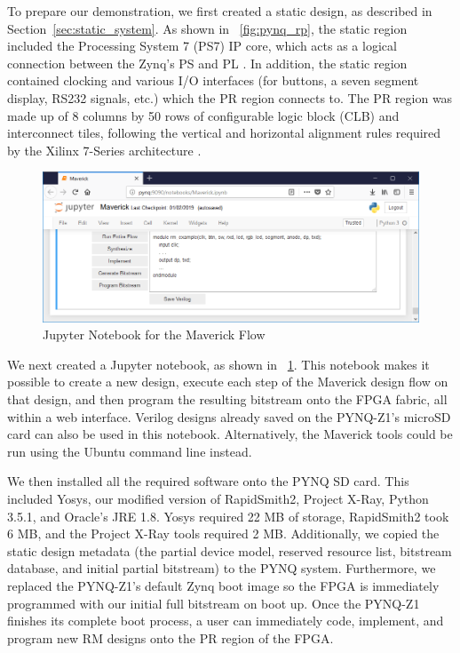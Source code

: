 To prepare our demonstration, we first created a static design, as described in Section~\ref{sec:static_system}. 
As shown in \figurename~\ref{fig:pynq_rp}, the static region included the Processing System 7 (PS7) IP core, which acts as a logical connection between the Zynq's PS and PL \cite{Xilinx:2017}. 
In addition, the static region contained clocking and various I/O interfaces (for buttons, a seven segment display, RS232 signals, etc.) which the PR region connects to.
The PR region was made up of 8 columns by 50 rows of configurable logic block (CLB) and interconnect tiles, following the vertical and horizontal alignment rules required by the Xilinx 7-Series architecture \cite{Xilinx:2018d}. 

\begin{figure}[htb]
	\centering
	\includegraphics[width=.85\textwidth,keepaspectratio]{figures/notebook.png}
	\caption{Jupyter Notebook for the Maverick Flow}
	\label{fig:notebook}
\end{figure}

We next created a Jupyter notebook, as shown in \figurename~\ref{fig:notebook}.
This notebook makes it possible to create a new design, execute each step of the Maverick design flow on that design, and then program the resulting bitstream onto the FPGA fabric, all within a web interface. 
Verilog designs already saved on the PYNQ-Z1's microSD card can also be used in this notebook.
Alternatively, the Maverick tools could be run using the Ubuntu command line instead. 

We then installed all the required software onto the PYNQ SD card.
This included Yosys, our modified version of RapidSmith2, Project X-Ray, Python 3.5.1, and Oracle's JRE 1.8.
Yosys required 22 MB of storage, RapidSmith2 took 6 MB, and the Project X-Ray tools required 2 MB.
Additionally, we copied the static design metadata (the partial device model, reserved resource list, bitstream database, and initial partial bitstream) to the PYNQ system.  
Furthermore, we replaced the PYNQ-Z1's default Zynq boot image so the FPGA is immediately programmed with our initial full bitstream on boot up.
Once the PYNQ-Z1 finishes its complete boot process, a user can immediately code, implement, and program new RM designs onto the PR region of the FPGA.

